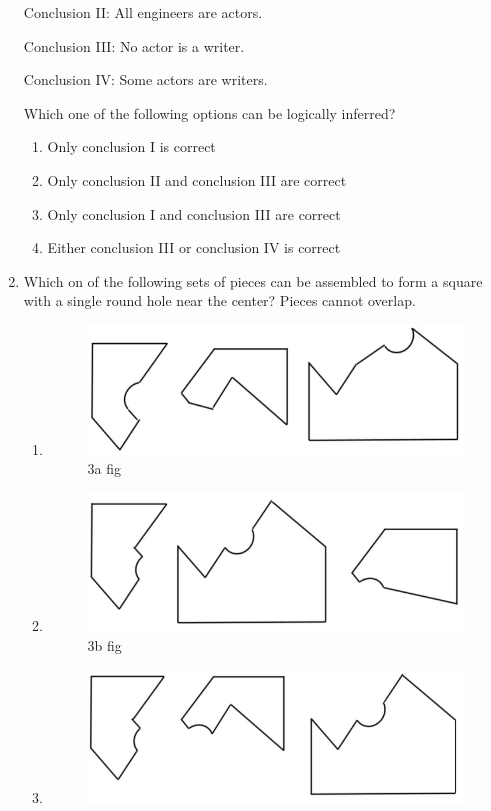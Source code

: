 \documentclass[journal]{IEEEtran}
\numberwithin{equation}{enumi}
\numberwithin{figure}{enumi}
\begin{document}
\begin{enumerate}[start=1, label={Q\arabic*.}]
Conclusion II: All engineers are actors.

Conclusion III: No actor is a writer.

Conclusion IV: Some actors are writers.

Which one of the following options can be logically inferred?
\begin{enumerate}
\item Only conclusion I is correct
\item Only conclusion II and conclusion III are correct
\item Only conclusion I and conclusion III are correct
\item Either conclusion III or conclusion IV is correct
\end{enumerate}
\newpage
\item Which on of the following sets of pieces can be assembled to form a square with a single round hole near the center? Pieces cannot overlap.
\begin{enumerate}
    \item \begin{figure}[H]
        \centering
        \includegraphics[width=0.5\linewidth]{figs/fig3a.jpeg}
        \caption{3a fig}
        \label{fig:3a}
    \end{figure}
    \item \begin{figure}[H]
        \centering
        \includegraphics[width=0.5\linewidth]{figs/fig3b.jpeg}
        \caption{3b fig}
        \label{fig:3b}
    \end{figure}
    \item \begin{figure}[H]
        \centering
        \includegraphics[width=0.5\linewidth]{figs/fig3c.jpeg}

\end{figure}
\end{enumerate}
\end{enumerate}
\end{document}

